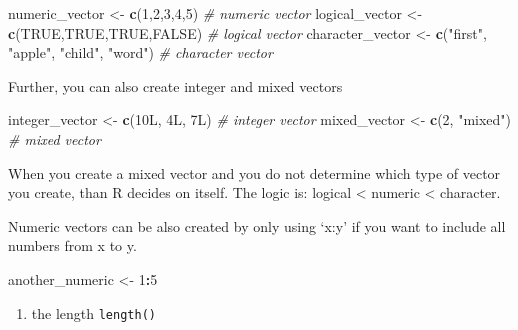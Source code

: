 \documentclass[]{report}
\newenvironment{Shaded}{\begin{snugshade}}{\end{snugshade}}
\newcommand{\KeywordTok}[1]{\textcolor[rgb]{0.13,0.29,0.53}{\textbf{#1}}}
\newcommand{\DecValTok}[1]{\textcolor[rgb]{0.00,0.00,0.81}{#1}}
\newcommand{\StringTok}[1]{\textcolor[rgb]{0.31,0.60,0.02}{#1}}
\newcommand{\CommentTok}[1]{\textcolor[rgb]{0.56,0.35,0.01}{\textit{#1}}}
\newcommand{\OtherTok}[1]{\textcolor[rgb]{0.56,0.35,0.01}{#1}}
\newcommand{\OperatorTok}[1]{\textcolor[rgb]{0.81,0.36,0.00}{\textbf{#1}}}
\newcommand{\NormalTok}[1]{#1}
\providecommand{\tightlist}{%
  \setlength{\itemsep}{0pt}\setlength{\parskip}{0pt}}
\begin{document}
\begin{Shaded}
\begin{Highlighting}[]
\NormalTok{numeric_vector <-}\StringTok{ }\KeywordTok{c}\NormalTok{(}\DecValTok{1}\NormalTok{,}\DecValTok{2}\NormalTok{,}\DecValTok{3}\NormalTok{,}\DecValTok{4}\NormalTok{,}\DecValTok{5}\NormalTok{) }\CommentTok{# numeric vector}
\NormalTok{logical_vector <-}\StringTok{ }\KeywordTok{c}\NormalTok{(}\OtherTok{TRUE}\NormalTok{,}\OtherTok{TRUE}\NormalTok{,}\OtherTok{TRUE}\NormalTok{,}\OtherTok{FALSE}\NormalTok{) }\CommentTok{# logical vector}
\NormalTok{character_vector <-}\StringTok{ }\KeywordTok{c}\NormalTok{(}\StringTok{"first"}\NormalTok{, }\StringTok{"apple"}\NormalTok{, }\StringTok{"child"}\NormalTok{, }\StringTok{"word"}\NormalTok{) }\CommentTok{# character vector}
\end{Highlighting}
\end{Shaded}

Further, you can also create integer and mixed vectors

\begin{Shaded}
\begin{Highlighting}[]
\NormalTok{integer_vector <-}\StringTok{ }\KeywordTok{c}\NormalTok{(10L, 4L, 7L) }\CommentTok{# integer vector}
\NormalTok{mixed_vector <-}\StringTok{ }\KeywordTok{c}\NormalTok{(}\DecValTok{2}\NormalTok{, }\StringTok{"mixed"}\NormalTok{) }\CommentTok{# mixed vector}
\end{Highlighting}
\end{Shaded}

When you create a mixed vector and you do not determine which type of
vector you create, than R decides on itself. The logic is: logical
\textless{} numeric \textless{} character.

Numeric vectors can be also created by only using `x:y' if you want to
include all numbers from x to y.

\begin{Shaded}
\begin{Highlighting}[]
\NormalTok{another_numeric <-}\StringTok{ }\DecValTok{1}\OperatorTok{:}\DecValTok{5}
\end{Highlighting}
\end{Shaded}

\begin{enumerate}
\def\labelenumi{\arabic{enumi}.}
\setcounter{enumi}{1}
\tightlist
\item
  the length \texttt{length()}
\end{enumerate}
\end{document}
